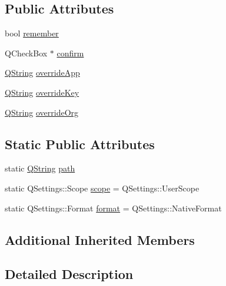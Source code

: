 \subsection*{Public Attributes}
\begin{DoxyCompactItemize}
\item 
bool \hyperlink{class_qxt_confirmation_message_private_a9de9dfa7c96ceea1f0ada51a94f46edb}{remember}
\item 
Q\-Check\-Box $\ast$ \hyperlink{class_qxt_confirmation_message_private_a5b22c7799ce4fb006da2cc7082674100}{confirm}
\item 
\hyperlink{group___u_a_v_objects_plugin_gab9d252f49c333c94a72f97ce3105a32d}{Q\-String} \hyperlink{class_qxt_confirmation_message_private_afbb03e49719e3a31401b56eb8808e546}{override\-App}
\item 
\hyperlink{group___u_a_v_objects_plugin_gab9d252f49c333c94a72f97ce3105a32d}{Q\-String} \hyperlink{class_qxt_confirmation_message_private_a55454a7daaa801ae761aecc645e5402e}{override\-Key}
\item 
\hyperlink{group___u_a_v_objects_plugin_gab9d252f49c333c94a72f97ce3105a32d}{Q\-String} \hyperlink{class_qxt_confirmation_message_private_ad52ca1317ac8c76996299eee66773229}{override\-Org}
\end{DoxyCompactItemize}
\subsection*{Static Public Attributes}
\begin{DoxyCompactItemize}
\item 
static \hyperlink{group___u_a_v_objects_plugin_gab9d252f49c333c94a72f97ce3105a32d}{Q\-String} \hyperlink{class_qxt_confirmation_message_private_aed1c9bb6d5775d542829686af8d7581a}{path}
\item 
static Q\-Settings\-::\-Scope \hyperlink{class_qxt_confirmation_message_private_a200e962e441de486fcf261417c60cedd}{scope} = Q\-Settings\-::\-User\-Scope
\item 
static Q\-Settings\-::\-Format \hyperlink{class_qxt_confirmation_message_private_a20ac931d85907a7ab1de8fa677a8d55d}{format} = Q\-Settings\-::\-Native\-Format
\end{DoxyCompactItemize}
\subsection*{Additional Inherited Members}


\subsection{Detailed Description}


